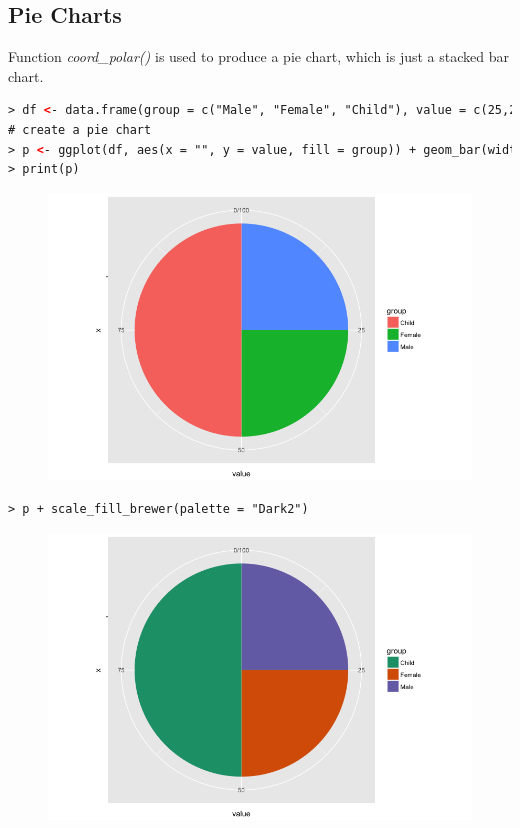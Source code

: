 \subsection{Pie Charts}
Function \textit{coord\_polar()} is used to produce a pie chart, which is just a stacked bar chart.
\begin{lstlisting}[language=html]
> df <- data.frame(group = c("Male", "Female", "Child"), value = c(25,25,50))
# create a pie chart
> p <- ggplot(df, aes(x = "", y = value, fill = group)) + geom_bar(width = 1, stat = 'identity') + coord_polar("y", start = 0)
> print(p)
\end{lstlisting}
\begin{figure}[H]\begin{center}\includegraphics[scale=1 ]{ilu/bg137.png}\end{center}\end{figure}
\begin{lstlisting}[language=html]
> p + scale_fill_brewer(palette = "Dark2")
\end{lstlisting}
\begin{figure}[H]\begin{center}\includegraphics[scale=1 ]{ilu/bg138.png}\end{center}\end{figure}
